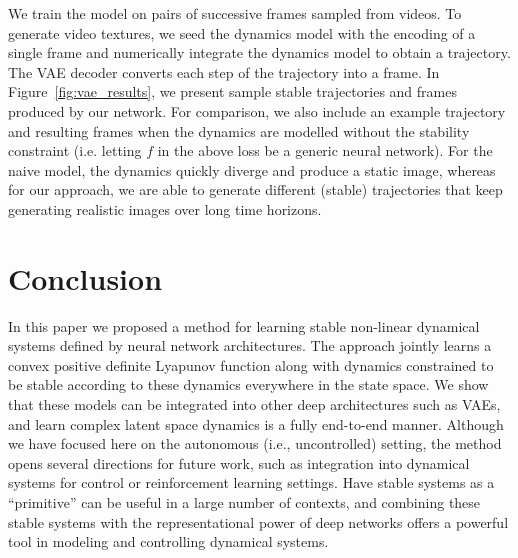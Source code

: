 We train the model on pairs of successive frames sampled from videos. To generate video textures, we seed the dynamics model with the encoding of a single frame and numerically integrate the dynamics model to obtain a trajectory. The VAE decoder converts each step of the trajectory into a frame.   In Figure~\ref{fig:vae_results}, we present sample stable trajectories and frames produced by our network. For comparison, we also include an example trajectory and resulting frames when the dynamics are modelled without the stability constraint (i.e. letting $f$ in the above loss be a generic neural network).  For the naive model, the dynamics quickly diverge and produce a static image, whereas for our approach, we are able to generate different (stable) trajectories that keep generating realistic images over long time horizons.

\section{Conclusion}
In this paper we  proposed a method for learning stable non-linear dynamical systems defined by neural network architectures.  The approach jointly learns a convex positive definite Lyapunov function along with dynamics constrained to be stable according to these dynamics everywhere in the state space.  We show that these models can be integrated into other deep architectures such as VAEs, and learn complex latent space dynamics is a fully end-to-end manner.  Although we have focused here on the autonomous (i.e., uncontrolled) setting, the method opens several directions for future work, such as integration into dynamical systems for control or reinforcement learning settings.  Have stable systems as a ``primitive'' can be useful in a large number of contexts, and combining these stable systems with the representational power of deep networks offers a powerful tool in modeling and controlling dynamical systems.

